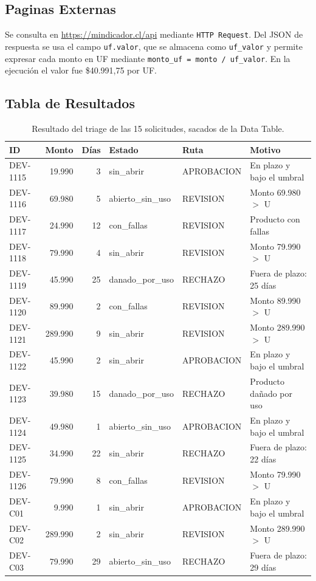 \subsection{Paginas Externas}
Se consulta en \url{https://mindicador.cl/api} mediante \texttt{HTTP Request}. Del JSON de respuesta se usa el campo \texttt{uf.valor}, que se almacena como
\texttt{uf\_valor} y permite expresar cada monto en UF mediante
\texttt{monto\_uf = monto / uf\_valor}. En la ejecución el
valor fue \$40.991,75 por UF.


\subsection{Tabla de Resultados}

\begin{table}[H]
  \centering
  \caption{Resultado del triage de las 15 solicitudes, sacados de la Data Table.}
  \small
    \begin{tabular}{lrrlll}
    \toprule
    ID & Monto & Días & Estado & Ruta & Motivo \\
    \midrule
    DEV-1115 & 19.990  & 3  & sin\_abrir        & APROBACION & En plazo y bajo el umbral \\
    DEV-1116 & 69.980  & 5  & abierto\_sin\_uso & REVISION   & Monto 69.980 $>$ U \\
    DEV-1117 & 24.990  & 12 & con\_fallas       & REVISION   & Producto con fallas \\
    DEV-1118 & 79.990  & 4  & sin\_abrir        & REVISION   & Monto 79.990 $>$ U \\
    DEV-1119 & 45.990  & 25 & danado\_por\_uso  & RECHAZO    & Fuera de plazo: 25 días \\
    DEV-1120 & 89.990  & 2  & con\_fallas       & REVISION   & Monto 89.990 $>$ U \\
    DEV-1121 & 289.990 & 9  & sin\_abrir        & REVISION   & Monto 289.990 $>$ U \\
    DEV-1122 & 45.990  & 2  & sin\_abrir        & APROBACION & En plazo y bajo el umbral \\
    DEV-1123 & 39.980  & 15 & danado\_por\_uso  & RECHAZO    & Producto dañado por uso \\
    DEV-1124 & 49.980  & 1  & abierto\_sin\_uso & APROBACION & En plazo y bajo el umbral \\
    DEV-1125 & 34.990  & 22 & sin\_abrir        & RECHAZO    & Fuera de plazo: 22 días \\
    DEV-1126 & 79.990  & 8  & con\_fallas       & REVISION   & Monto 79.990 $>$ U \\
    DEV-C01  & 9.990   & 1  & sin\_abrir        & APROBACION & En plazo y bajo el umbral \\
    DEV-C02  & 289.990 & 2  & sin\_abrir        & REVISION   & Monto 289.990 $>$ U \\
    DEV-C03  & 79.990  & 29 & abierto\_sin\_uso & RECHAZO    & Fuera de plazo: 29 días \\
    \bottomrule
    \end{tabular}%
  \label{tab:resultados}%
\end{table}%


